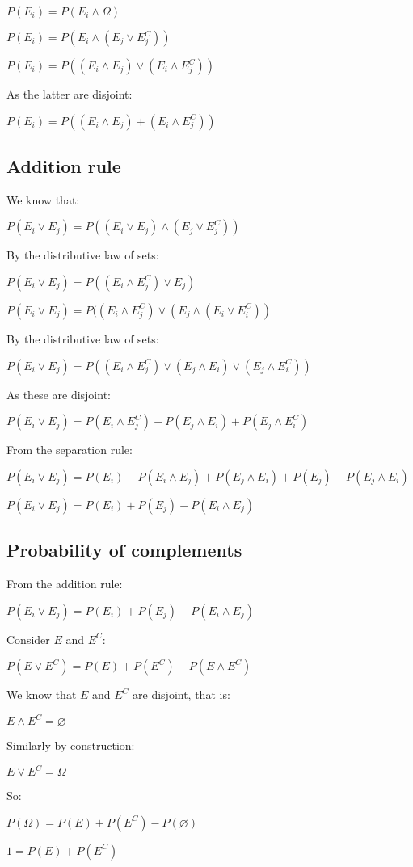 \(P(E_i)=P(E_i\land \Omega)\)

\(P(E_i)=P(E_i\land (E_j\lor E_j^C))\)

\(P(E_i)=P((E_i\land E_j)\lor (E_i\land E_j^C))\)

As the latter are disjoint:

\(P(E_i)=P((E_i\land E_j)+(E_i\land E_j^C))\)

\subsection{Addition rule}

We know that:

\(P(E_i\lor E_j)=P((E_i\lor E_j)\land (E_j\lor E_j^C))\)

By the distributive law of sets:

\(P(E_i\lor E_j)=P((E_i\land E_j^C)\lor E_j)\)

\(P(E_i\lor E_j)=P((E_i\land E_j^C)\lor (E_j\land (E_i\lor E_i^C))\)

By the distributive law of sets:

\(P(E_i\lor E_j)=P((E_i\land E_j^C)\lor (E_j\land E_i)\lor (E_j\land E_i^C))\)

As these are disjoint:

\(P(E_i\lor E_j)=P(E_i\land E_j^C)+ P(E_j\land E_i)+P(E_j\land E_i^C)\)

From the separation rule:

\(P(E_i\lor E_j)=P(E_i)-P(E_i\land E_j)+ P(E_j\land E_i)+P(E_j)-P(E_j\land E_i)\)

\(P(E_i\lor E_j)=P(E_i)+P(E_j)-P(E_i\land E_j)\)

\subsection{Probability of complements}

From the addition rule:

\(P(E_i\lor E_j)=P(E_i)+P(E_j)-P(E_i\land E_j)\)

Consider \(E\) and \(E^C\):

\(P(E\lor E^C)=P(E)+P(E^C)-P(E\land E^C)\)

We know that \(E\) and \(E^C\) are disjoint, that is:

\(E\land E^C=\varnothing\)

Similarly by construction:

\(E\lor E^C=\Omega \)

So:

\(P(\Omega )=P(E)+P(E^C)-P(\varnothing)\)

\(1=P(E)+P(E^C)\)

